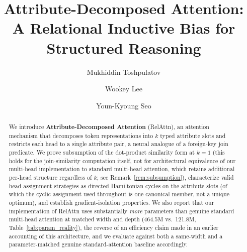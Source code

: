 \documentclass[review]{elsarticle}
\begin{document}
\begin{frontmatter}

\title{Attribute-Decomposed Attention: A Relational Inductive Bias for Structured Reasoning}

\author[gachon]{Mukhiddin Toshpulatov}

\author[inha]{Wookey Lee}

\author[inha2]{Youn-Kyoung Seo}

\address[gachon]{Department of Computer Science, Gachon University, Seongnam, Korea}
\address[inha]{BMSE, Inha University, Incheon 22212, Korea}
\address[inha2]{BMSE, Inha University, Incheon 22212, Korea}

\begin{abstract}
We introduce \textbf{Attribute-Decomposed Attention} (RelAttn), an attention mechanism that decomposes token representations into $k$ typed attribute slots and restricts each head to a single attribute pair, a neural analogue of a foreign-key join predicate. We prove subsumption of the dot-product similarity form at $k{=}1$ (this holds for the join-similarity computation itself, not for architectural equivalence of our multi-head implementation to standard multi-head attention, which retains additional per-head structure regardless of $k$; see Remark~\ref{rem:subsumption}), characterize valid head-assignment strategies as directed Hamiltonian cycles on the attribute slots (of which the cyclic assignment used throughout is one canonical member, not a unique optimum), and establish gradient-isolation properties. We also report that our implementation of RelAttn uses substantially \emph{more} parameters than genuine standard multi-head attention at matched width and depth (464.5M vs.\ 121.8M, Table~\ref{tab:param_reality}), the reverse of an efficiency claim made in an earlier accounting of this architecture, and we evaluate against both a same-width and a parameter-matched genuine standard-attention baseline accordingly.


\end{abstract}
\end{frontmatter}
\end{document}

